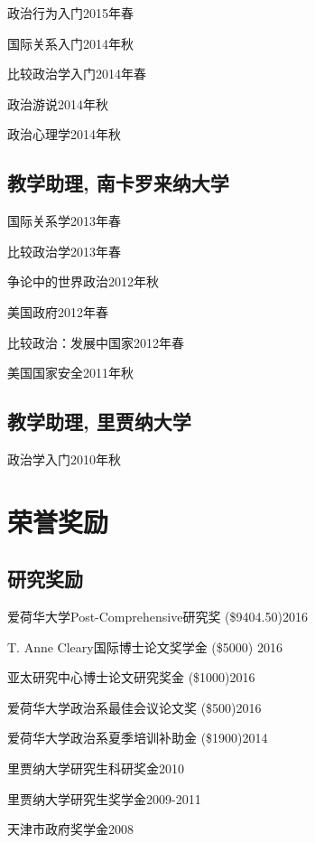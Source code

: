 \documentclass[10.5pt,]{article}
\providecommand{\tightlist}{%
  \setlength{\itemsep}{0pt}\setlength{\parskip}{0pt}}
\renewenvironment{itemize}{
  \begin{list}{}{
    \setlength{\leftmargin}{1.5em}
  }
}{
  \end{list}
}
\begin{document}
\begin{itemize}
\tightlist
\item
  政治行为入门\hfill 2015年春
\item
  国际关系入门\hfill 2014年秋
\item
  比较政治学入门\hfill 2014年春
\item
  政治游说\hfill 2014年秋
\item
  政治心理学\hfill 2014年秋
\end{itemize}

\subsection{教学助理, 南卡罗来纳大学}\label{-}

\begin{itemize}
\tightlist
\item
  国际关系学\hfill 2013年春
\item
  比较政治学\hfill 2013年春
\item
  争论中的世界政治\hfill 2012年秋
\item
  美国政府\hfill 2012年春
\item
  比较政治：发展中国家\hfill 2012年春
\item
  美国国家安全\hfill 2011年秋
\end{itemize}

\subsection{教学助理, 里贾纳大学}\label{-}

\begin{itemize}
\tightlist
\item
  政治学入门\hfill 2010年秋
\end{itemize}

\section{荣誉奖励}

\subsection{研究奖励}

\begin{itemize}
\tightlist
\item
  爱荷华大学Post-Comprehensive研究奖 (\$9404.50)\hfill 2016
\item
  T. Anne Cleary国际博士论文奖学金 (\$5000) \hfill 2016
\item
  亚太研究中心博士论文研究奖金 (\$1000)\hfill 2016
\item
  爱荷华大学政治系最佳会议论文奖 (\$500)\hfill 2016
\item
  爱荷华大学政治系夏季培训补助金 (\$1900)\hfill 2014
\item
  里贾纳大学研究生科研奖金\hfill 2010
\item
  里贾纳大学研究生奖学金\hfill 2009-2011
\item
  天津市政府奖学金\hfill 2008
\end{itemize}
\end{document}
